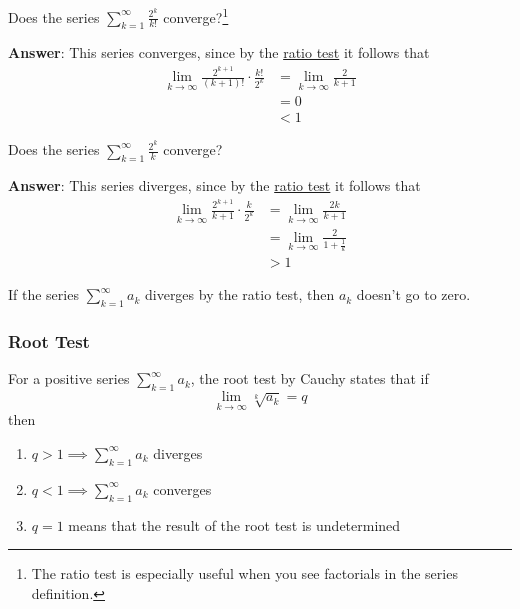 \begin{exm}\label{exm-positive-series:5}
	Does the series $\sum_{k=1}^\infty \frac{2^k}{k!}$ converge?\footnote{The ratio
		test is especially useful when you see factorials in the series definition.}
	\begin{flushleft}
		\textbf{Answer}: This series converges, since by the \hyperref[thm-ratio-test-series]{ratio test}
		it follows that
		\begin{align*}
			\lim_{k\to\infty} \frac{2^{k+1}}{(k+1)!}\cdot\frac{k!}{2^k}
			 & = \lim_{k\to\infty} \frac{2}{k+1} \\
			 & = 0                               \\
			 & < 1
		\end{align*}
	\end{flushleft}
\end{exm}

\begin{exm}\label{exm-positive-series:6}
	Does the series $\sum_{k=1}^\infty \frac{2^k}{k}$ converge?
	\begin{flushleft}
		\textbf{Answer}: This series diverges, since by the \hyperref[thm-ratio-test-series]{ratio test}
		it follows that
		\begin{align*}
			\lim_{k\to\infty} \frac{2^{k+1}}{k+1}\cdot\frac{k}{2^k}
			 & = \lim_{k\to\infty} \frac{2k}{k+1}          \\
			 & = \lim_{k\to\infty} \frac{2}{1+\frac{1}{k}} \\
			 & > 1
		\end{align*}
	\end{flushleft}
\end{exm}

\begin{rem}\label{rem-ratio-test}
	If the series $\sum_{k=1}^\infty a_k$ diverges by the ratio test, then $a_k$
	doesn't go to zero.
\end{rem}

\subsubsection{Root Test}\label{subsubsec-root-test-series}

\begin{thm}\label{thm-root-test-series}
	For a positive series $\sum_{k=1}^\infty a_k$, the root test by Cauchy
	states that if
	\begin{equation*}
		\lim_{k\to\infty}\sqrt[k]{a_k} = q
	\end{equation*}
	then
	\begin{enumerate}
		\item $q > 1 \implies \sum_{k=1}^\infty a_k$ diverges
		\item $q < 1 \implies \sum_{k=1}^\infty a_k$ converges
		\item $q = 1$ means that the result of the root test is undetermined
	\end{enumerate}
\end{thm}


